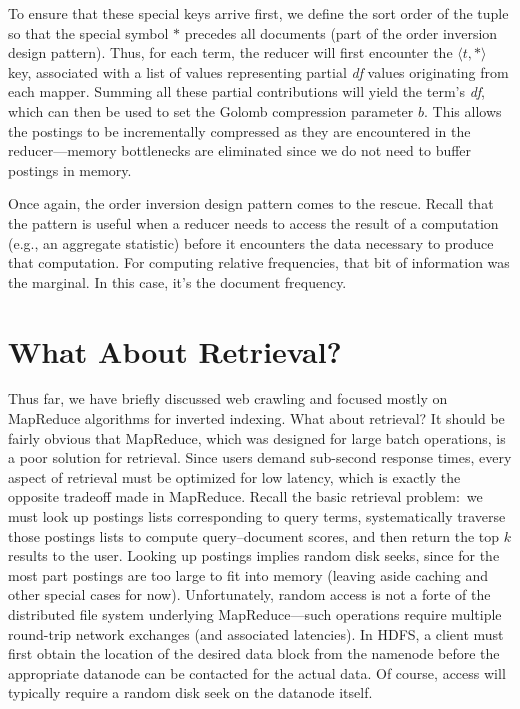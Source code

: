To ensure that these special keys arrive first, we define the sort
order of the tuple so that the special symbol $\ast$ precedes all
documents (part of the order inversion design pattern).  Thus, for
each term, the reducer will first encounter the $\langle t, \ast
\rangle$ key, associated with a list of values representing partial
       \emph{df} values originating from each mapper.  Summing all
       these partial contributions will yield the term's \emph{df},
       which can then be used to set the Golomb compression parameter
       $b$.  This allows the postings to be incrementally compressed
       as they are encountered in the reducer---memory bottlenecks are
       eliminated since we do not need to buffer postings in memory.

Once again, the order inversion design pattern comes to the rescue.
Recall that the pattern is useful when a reducer needs to access the
result of a computation (e.g., an aggregate statistic) before it
encounters the data necessary to produce that computation.  For
computing relative frequencies, that bit of information was the
marginal.  In this case, it's the document frequency.

\section{What About Retrieval?}
\label{chapter-indexing:retrieval}

Thus far, we have briefly discussed web crawling and focused mostly on
MapReduce algorithms for inverted indexing.  What about retrieval?  It
should be fairly obvious that MapReduce, which was designed for large
batch operations, is a poor solution for retrieval.  Since users
demand sub-second response times, every aspect of retrieval must be
optimized for low latency, which is exactly the opposite tradeoff made
in MapReduce.  Recall the basic retrieval problem:\ we must look up
postings lists corresponding to query terms, systematically traverse
those postings lists to compute query--document scores, and then
return the top $k$ results to the user.  Looking up postings implies
random disk seeks, since for the most part postings are too large to
fit into memory (leaving aside caching and other special cases for
now).  Unfortunately, random access is not a forte of the distributed
file system underlying MapReduce---such operations require multiple
round-trip network exchanges (and associated latencies).  In HDFS, a
client must first obtain the location of the desired data block from
the namenode before the appropriate datanode can be contacted for the
actual data.  Of course, access will typically require a random disk
seek on the datanode itself.

